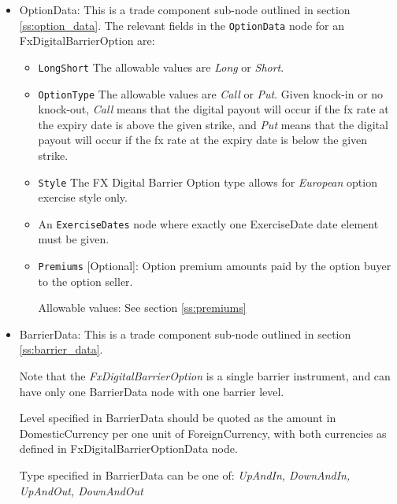 \begin{itemize}

\item OptionData: This is a trade component sub-node outlined in section \ref{ss:option_data}. 
The relevant fields in the \lstinline!OptionData! node for an FxDigitalBarrierOption are:

\begin{itemize}
\item \lstinline!LongShort! The allowable values are \emph{Long} or \emph{Short}.

\item \lstinline!OptionType! The allowable values are \emph{Call} or \emph{Put}. Given knock-in or no knock-out,  \emph{Call} means that the digital payout will occur if the fx rate at the expiry date is above the given strike, and \emph{Put} means that the digital payout will occur if the fx rate at the expiry date is below the given strike.

\item  \lstinline!Style! The FX Digital Barrier Option type allows for \emph{European} option exercise style only.


\item An \lstinline!ExerciseDates! node where exactly one ExerciseDate date element must be given.

\item \lstinline!Premiums! [Optional]: Option premium amounts paid by the option buyer to the option seller.

Allowable values:  See section \ref{ss:premiums}

\end{itemize}

\item BarrierData: This is a trade component sub-node outlined in section \ref{ss:barrier_data}. 

Note that the \emph{FxDigitalBarrierOption} is a single barrier instrument, and can have only one BarrierData node with one barrier level.

Level specified in BarrierData should be quoted as the amount in DomesticCurrency per one unit of ForeignCurrency, with both currencies as defined in FxDigitalBarrierOptionData node.

Type specified in BarrierData can be one of: \emph{UpAndIn, DownAndIn, UpAndOut, DownAndOut}


\end{itemize}

